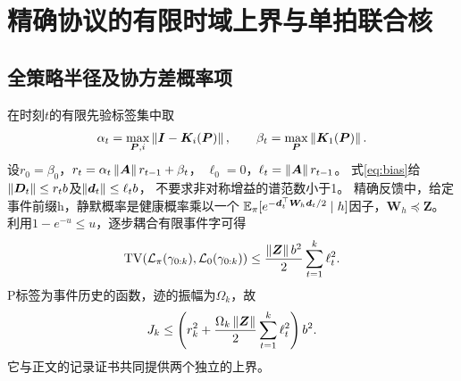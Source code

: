 \section{精确协议的有限时域上界与单拍联合核}
\label{app:single}
\subsection{全策略半径及协方差概率项}
在时刻$t$的有限先验标签集中取
\[
\alpha_t=\max_{{\bm{P}},i}\left\|{\bm{I}}-{\bm{K}}_i({\bm{P}})\right\|,\qquad \beta_t=\max_{\bm{P}}\left\|{\bm{K}}_1({\bm{P}})\right\|.
\]
设$r_0=\beta_0$，$r_t=\alpha_t\left\|\bm{A}\right\| r_{t-1}+\beta_t$，
$\ell_0=0$，$\ell_t=\left\|\bm{A}\right\| r_{t-1}$。
式\eqref{eq:bias}给$\left\|{\bm{D}}_t\right\|\le r_tb$及$\left\|{\bm{d}}_t\right\|\le\ell_tb$，
不要求非对称增益的谱范数小于1。
精确反馈中，给定事件前缀h，静默概率是健康概率乘以一个
$\mathbb E_\pi[e^{-{\bm{d}}_t^\top {\bm{W}}_h{\bm{d}}_t/2}\mid h]$因子，${\bm{W}}_h\preceq {\bm{Z}}$。
利用$1-e^{-u}\le u$，逐步耦合有限事件字可得
\[
\operatorname{TV}(\mathcal L_\pi(\gamma_{0:k}),\mathcal L_0(\gamma_{0:k}))
\le\frac{\left\|\bm{Z}\right\| b^2}{2}\sum_{t=1}^k\ell_t^2.
\]
P标签为事件历史的函数，迹的振幅为$\Omega_k$，故
\[
J_k\le
\left(r_k^2+\frac{\Omega_k\left\|\bm{Z}\right\|}{2}\sum_{t=1}^k\ell_t^2\right)b^2.
\]
它与正文的记录证书共同提供两个独立的上界。


